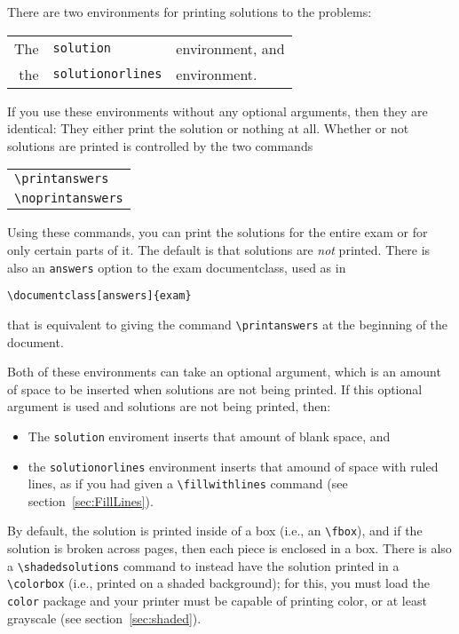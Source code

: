 \documentclass[12pt]{exam}
\begin{document}
 
There are two environments for printing solutions to the problems:
\begin{center}
  \begin{tabular}{rll}
    The& \verb"solution"& environment, and\\
    the& \verb"solutionorlines"& environment.
  \end{tabular}
\end{center}
If you use these environments without any optional arguments, then
they are identical: They either print the solution or nothing at all.
Whether or not solutions are printed is controlled by the two commands
\begin{center}
  \begin{tabular}{l}
    \verb"\printanswers"\\
    \verb"\noprintanswers"
  \end{tabular}
\end{center}
Using these commands, you can print the solutions for the entire exam
or for only certain parts of it.  The default is that solutions are
\emph{not} printed.  There is also an \verb"answers" option to the
exam documentclass, used as in
\begin{center}
  \verb"\documentclass[answers]{exam}"
\end{center}
that is equivalent to giving the command \verb"\printanswers" at the
beginning of the document.

Both of these environments can take an optional argument, which is an
amount of space to be inserted when solutions are not being printed.
If this optional argument is used and solutions are not being printed,
then:
\begin{itemize}
\item The \verb"solution" enviroment inserts that amount of blank
  space, and
\item the \verb"solutionorlines" environment inserts that amound of
  space with ruled lines, as if you had given a \verb"\fillwithlines"
  command (see section~\ref{sec:FillLines}).
\end{itemize}

By default, the solution is printed inside of a box (i.e., an
\verb"\fbox"), and if the solution is broken across pages, then each
piece is enclosed in a box.  There is also a \verb"\shadedsolutions"
command to instead have the solution printed in a \verb"\colorbox"
(i.e., printed on a shaded background); for this, you must load the
\verb"color" package and your printer must be capable of printing
color, or at least grayscale (see section~\ref{sec:shaded}).
\end{document}
